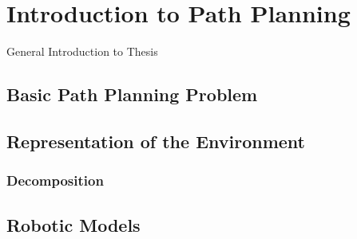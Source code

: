 \chapter{Introduction to Path Planning}\label{ch:introductionplanning}
General Introduction to Thesis

\section{Basic Path Planning Problem}\label{sec:basic}

\section{Representation of the Environment}\label{sec:representation}
\subsection{Decomposition}\label{sec:decomposition}

\section{Robotic Models}\label{sec:model}




